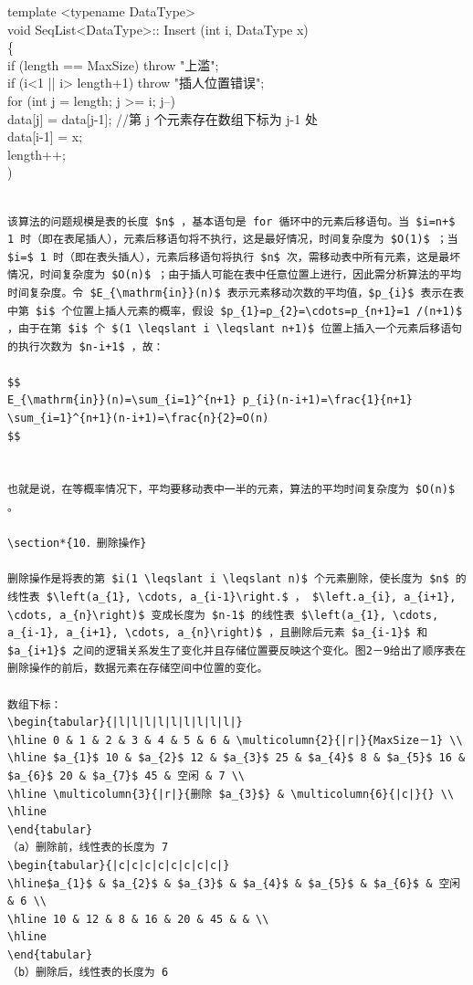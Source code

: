 \documentclass[10pt]{article}
\begin{document}
template <typename DataType>\\
void SeqList<DataType>:: Insert (int i, DataType x)\\
\{\\
if (length == MaxSize) throw "上滥";\\
if (i<1 || i> length+1) throw "插人位置错误";\\
for (int j = length; j >= i; j--)\\[0pt]
data[j] = data[j-1]; //第 j 个元素存在数组下标为 j-1 处\\[0pt]
data[i-1] = x;\\
length++;\\
)

\begin{verbatim}

该算法的问题规模是表的长度 $n$ ，基本语句是 for 循环中的元素后移语句。当 $i=n+$ 1 时（即在表尾插人），元素后移语句将不执行，这是最好情况，时间复杂度为 $O(1)$ ；当 $i=$ 1 时（即在表头插人），元素后移语句将执行 $n$ 次，需移动表中所有元素，这是最坏情况，时间复杂度为 $O(n)$ ；由于插人可能在表中任意位置上进行，因此需分析算法的平均时间复杂度。令 $E_{\mathrm{in}}(n)$ 表示元素移动次数的平均值，$p_{i}$ 表示在表中第 $i$ 个位置上插人元素的概率，假设 $p_{1}=p_{2}=\cdots=p_{n+1}=1 /(n+1)$ ，由于在第 $i$ 个 $(1 \leqslant i \leqslant n+1)$ 位置上插入一个元素后移语句的执行次数为 $n-i+1$ ，故：

$$
E_{\mathrm{in}}(n)=\sum_{i=1}^{n+1} p_{i}(n-i+1)=\frac{1}{n+1} \sum_{i=1}^{n+1}(n-i+1)=\frac{n}{2}=O(n)
$$


也就是说，在等概率情况下，平均要移动表中一半的元素，算法的平均时间复杂度为 $O(n)$ 。

\section*{10．删除操作}

删除操作是将表的第 $i(1 \leqslant i \leqslant n)$ 个元素删除，使长度为 $n$ 的线性表 $\left(a_{1}, \cdots, a_{i-1}\right.$ ， $\left.a_{i}, a_{i+1}, \cdots, a_{n}\right)$ 变成长度为 $n-1$ 的线性表 $\left(a_{1}, \cdots, a_{i-1}, a_{i+1}, \cdots, a_{n}\right)$ ，且删除后元素 $a_{i-1}$ 和 $a_{i+1}$ 之间的逻辑关系发生了变化并且存储位置要反映这个变化。图2－9给出了顺序表在删除操作的前后，数据元素在存储空间中位置的变化。

数组下标：
\begin{tabular}{|l|l|l|l|l|l|l|l|l|}
\hline 0 & 1 & 2 & 3 & 4 & 5 & 6 & \multicolumn{2}{|r|}{MaxSize－1} \\
\hline $a_{1}$ 10 & $a_{2}$ 12 & $a_{3}$ 25 & $a_{4}$ 8 & $a_{5}$ 16 & $a_{6}$ 20 & $a_{7}$ 45 & 空闲 & 7 \\
\hline \multicolumn{3}{|r|}{删除 $a_{3}$} & \multicolumn{6}{|c|}{} \\
\hline
\end{tabular}
（a）删除前，线性表的长度为 7
\begin{tabular}{|c|c|c|c|c|c|c|c|}
\hline$a_{1}$ & $a_{2}$ & $a_{3}$ & $a_{4}$ & $a_{5}$ & $a_{6}$ & 空闲 & 6 \\
\hline 10 & 12 & 8 & 16 & 20 & 45 & & \\
\hline
\end{tabular}
（b）删除后，线性表的长度为 6


\end{verbatim}
\end{document}
